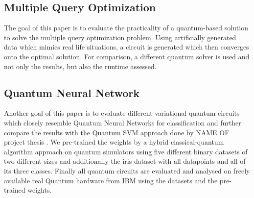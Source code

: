 \subsection{Multiple Query Optimization}
The goal of this paper is to evaluate the practicality of a quantum-based solution to solve the multiple query optimization problem. Using artificially generated data which mimics real life situations, a circuit is generated which then converges onto the optimal solution. For comparison, a different quantum solver is used and not only the results, but also the runtime assessed.

\subsection{Quantum Neural Network}
Another goal of this paper is to evaluate different variational quantum circuits which closely resemble Quantum Neural Networks for classification and further compare the results with the Quantum SVM approach done by NAME OF project thesis . We pre-trained the weights by a hybrid classical-quantum algorithm approach on quantum simulators using five different binary datasets of two different sizes and additionally the iris dataset with all datapoints and all of its three classes. Finally all quantum circuits are evaluated and analysed on freely available real Quantum hardware from IBM using the datasets and the pre-trained weights.

\clearpage
